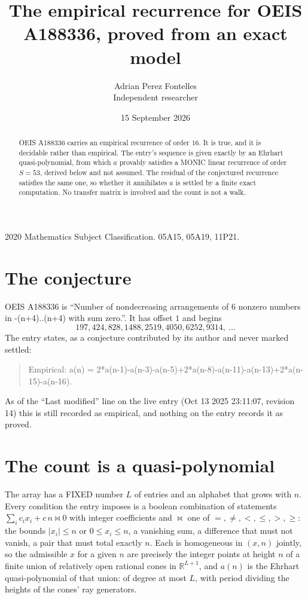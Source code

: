 \documentclass[11pt,a4paper]{article}
\title{The empirical recurrence for OEIS A188336, proved from an exact model}
\author{Adrian Perez Fontelles\\ \small Independent researcher}
\date{15 September 2026}
\theoremstyle{plain}
\theoremstyle{definition}
\begin{document}
\maketitle

\begin{abstract}
OEIS A188336 carries an empirical recurrence of order $16$. It is true, and it is
decidable rather than empirical. The entry's sequence is given exactly by an Ehrhart quasi-polynomial, from
which $a$ provably satisfies a MONIC linear recurrence of order $S=53$, derived below and not
assumed. The residual of the conjectured recurrence satisfies the same one, so whether it
annihilates $a$ is settled by a finite exact computation. No transfer matrix is involved and the count is not a walk.
\end{abstract}

\noindent\small 2020 Mathematics Subject Classification. 05A15, 05A19, 11P21.\normalsize

\section{The conjecture}

OEIS A188336 is ``Number of nondecreasing arrangements of 6 nonzero numbers in -(n+4)..(n+4) with sum zero.''. It has offset $1$ and begins
\[
197, 424, 828, 1488, 2519, 4050, 6252, 9314,\ \dots
\]
The entry states, as a conjecture contributed by its author and never marked settled:
\begin{quote}
Empirical: a(n) = 2*a(n-1)-a(n-3)-a(n-5)+2*a(n-8)-a(n-11)-a(n-13)+2*a(n-15)-a(n-16).
\end{quote}
As of the ``Last modified'' line on the live entry (Oct 13 2025 23:11:07, revision 14)
this is still recorded as empirical, and nothing on the entry records it as proved.

\section{The count is a quasi-polynomial}

The array has a FIXED number $L$ of entries and an alphabet that grows with $n$. Every
condition the entry imposes is a boolean combination of statements
$\sum_i c_ix_i + c\,n \bowtie 0$ with integer coefficients and $\bowtie$ one of
$=,\ne,<,\le,>,\ge$: the bounds $|x_i|\le n$ or $0\le x_i\le n$, a vanishing sum, a difference
that must not vanish, a pair that must total exactly $n$. Each is homogeneous in $(x,n)$
jointly, so the admissible $x$ for a given $n$ are precisely the integer points at height $n$
of a finite union of relatively open rational cones in $\mathbb{R}^{L+1}$, and $a(n)$ is
the Ehrhart quasi-polynomial of that union: of degree at most $L$, with period dividing the
heights of the cones' ray generators.
\end{document}
